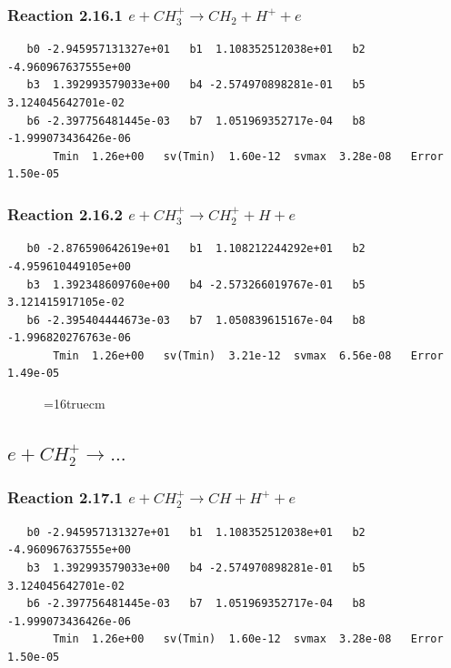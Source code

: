 \documentclass[12pt,dvipdfmx]{article}
\begin{document}
\subsubsection{
Reaction 2.16.1   $e + CH_3^+ \rightarrow CH_2 + H^+ + e $
}

\begin{small}\begin{verbatim}
   b0 -2.945957131327e+01   b1  1.108352512038e+01   b2 -4.960967637555e+00
   b3  1.392993579033e+00   b4 -2.574970898281e-01   b5  3.124045642701e-02
   b6 -2.397756481445e-03   b7  1.051969352717e-04   b8 -1.999073436426e-06
       Tmin  1.26e+00   sv(Tmin)  1.60e-12  svmax  3.28e-08   Error  1.50e-05
\end{verbatim}\end{small}

\subsubsection{
Reaction 2.16.2   $e + CH_3^+ \rightarrow CH_2^+ + H + e $
}

\begin{small}\begin{verbatim}
   b0 -2.876590642619e+01   b1  1.108212244292e+01   b2 -4.959610449105e+00
   b3  1.392348609760e+00   b4 -2.573266019767e-01   b5  3.121415917105e-02
   b6 -2.395404444673e-03   b7  1.050839615167e-04   b8 -1.996820276763e-06
       Tmin  1.26e+00   sv(Tmin)  3.21e-12  svmax  6.56e-08   Error  1.49e-05
\end{verbatim}\end{small}

\begin{figure} \label{met.2_2.16}
\epsfxsize=16truecm
\end{figure}
\newpage

\subsection{
$e + CH_2^+ \rightarrow ... $
}

\subsubsection{
Reaction 2.17.1   $e + CH_2^+ \rightarrow CH + H^+ + e $
}

\begin{small}\begin{verbatim}
   b0 -2.945957131327e+01   b1  1.108352512038e+01   b2 -4.960967637555e+00
   b3  1.392993579033e+00   b4 -2.574970898281e-01   b5  3.124045642701e-02
   b6 -2.397756481445e-03   b7  1.051969352717e-04   b8 -1.999073436426e-06
       Tmin  1.26e+00   sv(Tmin)  1.60e-12  svmax  3.28e-08   Error  1.50e-05
\end{verbatim}\end{small}
\end{document}
